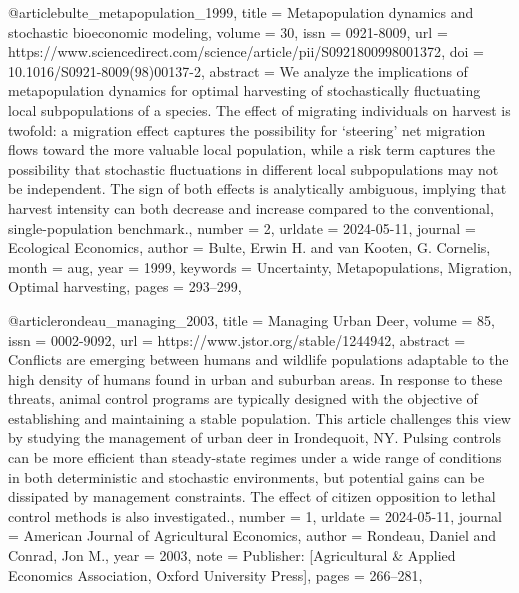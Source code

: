 {{{{@article{bulte_metapopulation_1999,
	title = {Metapopulation dynamics and stochastic bioeconomic modeling},
	volume = {30},
	issn = {0921-8009},
	url = {https://www.sciencedirect.com/science/article/pii/S0921800998001372},
	doi = {10.1016/S0921-8009(98)00137-2},
	abstract = {We analyze the implications of metapopulation dynamics for optimal harvesting of stochastically fluctuating local subpopulations of a species. The effect of migrating individuals on harvest is twofold: a migration effect captures the possibility for ‘steering’ net migration flows toward the more valuable local population, while a risk term captures the possibility that stochastic fluctuations in different local subpopulations may not be independent. The sign of both effects is analytically ambiguous, implying that harvest intensity can both decrease and increase compared to the conventional, single-population benchmark.},
	number = {2},
	urldate = {2024-05-11},
	journal = {Ecological Economics},
	author = {Bulte, Erwin H. and van Kooten, G. Cornelis},
	month = aug,
	year = {1999},
	keywords = {Uncertainty, Metapopulations, Migration, Optimal harvesting},
	pages = {293--299},
}

@article{rondeau_managing_2003,
	title = {Managing {Urban} {Deer}},
	volume = {85},
	issn = {0002-9092},
	url = {https://www.jstor.org/stable/1244942},
	abstract = {Conflicts are emerging between humans and wildlife populations adaptable to the high density of humans found in urban and suburban areas. In response to these threats, animal control programs are typically designed with the objective of establishing and maintaining a stable population. This article challenges this view by studying the management of urban deer in Irondequoit, NY. Pulsing controls can be more efficient than steady-state regimes under a wide range of conditions in both deterministic and stochastic environments, but potential gains can be dissipated by management constraints. The effect of citizen opposition to lethal control methods is also investigated.},
	number = {1},
	urldate = {2024-05-11},
	journal = {American Journal of Agricultural Economics},
	author = {Rondeau, Daniel and Conrad, Jon M.},
	year = {2003},
	note = {Publisher: [Agricultural \& Applied Economics Association, Oxford University Press]},
	pages = {266--281},
}

}}}}

